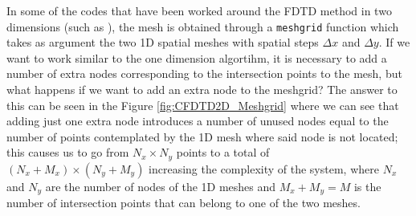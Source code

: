 \documentclass[12pt, oneside]{book}
\begin{document}
In some of the codes that have been worked around the FDTD method in two dimensions (such as \cite{Angulo_PyDG1D_2024}), the mesh is obtained through a \texttt{meshgrid} function \cite{harris2020array} which takes as argument the two 1D spatial meshes with spatial steps $\Delta x$ and $\Delta y$. If we want to work similar to the one dimension algortihm, it is necessary to add a number of extra nodes corresponding to the intersection points to the mesh, but what happens if we want to add an extra node to the meshgrid? The answer to this can be seen in the Figure \ref{fig:CFDTD2D_Meshgrid} where we can see that adding just one extra node introduces a number of unused nodes equal to the number of points contemplated by the 1D mesh where said node is not located; this causes us to go from $N_x \times N_y$ points to a total of $(N_x + M_x) \times (N_y + M_y)$ increasing the complexity of the system, where $N_x$ and $N_y$ are the number of nodes of the 1D meshes and $M_x + M_y = M$ is the number of intersection points that can belong to one of the two meshes. 
\end{document}
